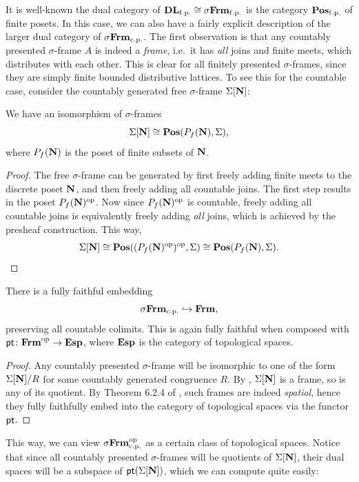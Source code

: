 It is well-known the dual category of $\mathbf{DL}_{\mathrm{f.p.}} \cong \sigma\mathbf{Frm}_{\mathrm{f.p.}}$ is the category $\mathbf{Pos}_{\mathrm{f.p.}}$ of finite posets. In this case, we can also have a fairly explicit description of the larger dual category of $\sigma\mathbf{Frm}_{\mathrm{c.p.}}$. The first observation is that any countably presented $\sigma$-frame $A$ is indeed a \emph{frame}, i.e.\ it has \emph{all} joins and finite meets, which distributes with each other. This is clear for all finitely presented $\sigma$-frames, since they are simply finite bounded distributive lattices. To see this for the countable case, consider the countably generated free $\sigma$-frame $\Sigma[\mathbf{N}]$:

\begin{lemma}\label{lem:cgfreesframe}
  We have an isomorphism of $\sigma$-frames
  \[ \Sigma[\N] \cong \Pos(P_f(\N),\Sigma)\text{,} \]
  where $P_f(\mathbf{N})$ is the poset of finite subsets of $\mathbf{N}$.
\end{lemma}
\begin{proof}
  The free $\sigma$-frame can be generated by first freely adding finite meets to the discrete poset $\mathbf{N}$, and then freely adding all countable joins. The first step results in the poset $P_f(\mathbf{N})^{\mathrm{op}}$. Now since $P_f(\mathbf{N})^{\mathrm{op}}$ is countable, freely adding all countable joins is equivalently freely adding \emph{all} joins, which is achieved by the presheaf construction. This way,
  \[ \Sigma[\mathbf{N}] \cong \mathbf{Pos}((P_f(\mathbf{N})^{\mathrm{op}})^{\mathrm{op}},\Sigma) \cong \mathbf{Pos}(P_f(\mathbf{N}),\Sigma). \qedhere \]
\end{proof}

\begin{corollary}\label{cor:dualsframe}
  There is a fully faithful embedding
  \[ \sFrm\cp \hook \Frm\text{,} \]
  preserving all countable colimits. This is again fully faithful when composed with $\mathsf{pt} \colon \mathbf{Frm}^{\mathrm{op}} \to \mathbf{Esp}$, where $\mathbf{Esp}$ is the category of topological spaces.
\end{corollary}
\begin{proof}
  Any countably presented $\sigma$-frame will be isomorphic to one of the form $\Sigma[\mathbf{N}]/R$ for some countably generated congruence $R$. By , $\Sigma[\mathbf{N}]$ is a frame, so is any of its quotient. By Theorem 6.2.4 of \citet{makkai2006first}, such frames are indeed \emph{spatial}, hence they fully faithfully embed into the category of topological spaces via the functor $\mathsf{pt}$.
\end{proof}

This way, we can view $\sigma\mathbf{Frm}_{\mathrm{c.p.}}^{\mathrm{op}}$ as a certain class of topological spaces. Notice that since all countably presented $\sigma$-frames will be quotients of $\Sigma[\mathbf{N}]$, their dual spaces will be a subspace of $\mathsf{pt}(\Sigma[\mathbf{N}])$, which we can compute quite easily:

